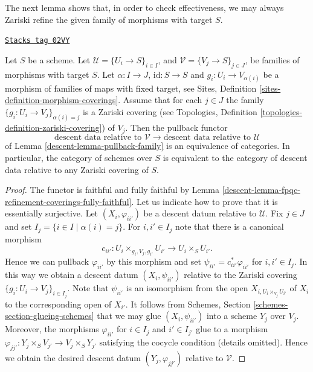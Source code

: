 The next lemma shows that, in order to check effectiveness,
we may always Zariski refine the given family of morphisms
with target $S$.

\begin{lemma}
\label{descent-lemma-Zariski-refinement-coverings-equivalence}
\href{https://stacks.math.columbia.edu/tag/02VY}{\texttt{Stacks tag 02VY}}

Let $S$ be a scheme.
Let $\mathcal{U} = \{U_i \to S\}_{i \in I}$, and
$\mathcal{V} = \{V_j \to S\}_{j \in J}$,
be families of morphisms with target $S$.
Let $\alpha : I \to J$, $\text{id} : S \to S$ and
$g_i : U_i \to V_{\alpha(i)}$ be a morphism of families
of maps with fixed target, see
Sites, Definition \ref{sites-definition-morphism-coverings}.
Assume that for each $j \in J$ the family
$\{g_i : U_i \to V_j\}_{\alpha(i) = j}$ is a Zariski covering (see
Topologies, Definition \ref{topologies-definition-zariski-covering})
of $V_j$. Then the pullback functor
$$
\text{descent data relative to }
\mathcal{V}
\longrightarrow
\text{descent data relative to }
\mathcal{U}
$$
of Lemma \ref{descent-lemma-pullback-family} is an equivalence of categories.
In particular, the category of schemes over $S$
is equivalent to the category
of descent data relative to any Zariski covering of $S$.
\end{lemma}

\begin{proof}

The functor is faithful and fully faithful by
Lemma \ref{descent-lemma-fpqc-refinement-coverings-fully-faithful}.
Let us indicate how to prove that it is essentially surjective.
Let $(X_i, \varphi_{ii'})$ be a descent datum relative to $\mathcal{U}$.
Fix $j \in J$ and set $I_j = \{i \in I \mid \alpha(i) = j\}$.
For $i, i' \in I_j$ note that there is a canonical morphism
$$
c_{ii'} : U_i \times_{g_i, V_j, g_{i'}} U_{i'} \to U_i \times_S U_{i'}.
$$
Hence we can pullback $\varphi_{ii'}$ by this morphism
and set $\psi_{ii'} = c_{ii'}^*\varphi_{ii'}$ for $i, i' \in I_j$.
In this way we obtain a descent datum $(X_i, \psi_{ii'})$
relative to the Zariski covering
$\{g_i : U_i \to V_j\}_{i \in I_j}$.
Note that $\psi_{ii'}$ is an isomorphism from the open
$X_{i, U_i \times_{V_j} U_{i'}}$ of $X_i$ to the corresponding
open of $X_{i'}$. It follows from
Schemes, Section \ref{schemes-section-glueing-schemes}
that we may glue $(X_i, \psi_{ii'})$ into a scheme
$Y_j$ over $V_j$. Moreover, the morphisms $\varphi_{ii'}$
for $i \in I_j$ and $i' \in I_{j'}$ glue to a morphism
$\varphi_{jj'} : Y_j \times_S V_{j'} \to V_j \times_S Y_{j'}$
satisfying the cocycle condition (details omitted).
Hence we obtain the desired descent datum
$(Y_j, \varphi_{jj'})$ relative to $\mathcal{V}$.
\end{proof}

